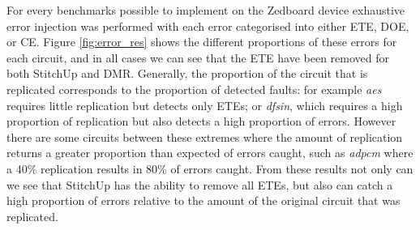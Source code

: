 For every benchmarks possible to implement on the Zedboard device
exhaustive error injection was performed with each error categorised into either ETE, DOE, or CE.
Figure \ref{fig:error_res} shows the different proportions of these errors for each circuit, and in
all cases we can see that the ETE have been removed for both StitchUp and DMR.
Generally, the proportion of the circuit that is replicated corresponds to the proportion of detected faults: for example \emph{aes}
requires little replication but detects only ETEs; or \emph{dfsin}, which requires a high proportion
of replication but also detects a high proportion of errors.
However there are some circuits between these extremes where the amount of replication returns a greater
proportion than expected of errors caught, such as \emph{adpcm} where a 40\% replication results in 80\% of errors caught.
From these results not only can we see that StitchUp has the ability to remove all ETEs, but also
can catch a high proportion of errors relative to the amount of the original circuit that was replicated.

